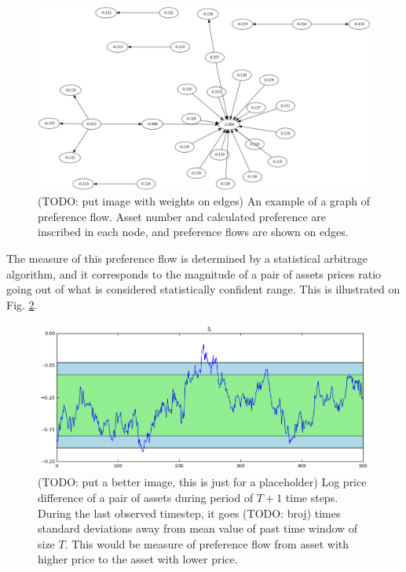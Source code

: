 \documentclass[letterpaper, 10 pt, conference]{ieeeconf}
\begin{document}
  \begin{figure}[h]
    \centering
    \includegraphics[width=\columnwidth]{graphics/graph.pdf}
    \caption{(TODO: put image with weights on edges) An example of a graph of preference flow. Asset number and calculated preference are inscribed in each node, and preference flows are shown on edges.}
    \label{fig:graph}
  \end{figure}
  
  The measure of this preference flow is determined by a statistical arbitrage algorithm, and it corresponds to the magnitude of a pair of assets prices ratio going out of what is considered statistically confident range.
  This is illustrated on Fig. \ref{fig:devmag}.
  
  \begin{figure}[h]
    \centering
    \includegraphics[width=0.9\columnwidth]{graphics/deviation-magnitude.png}
    \caption{(TODO: put a better image, this is just for a placeholder) Log price difference of a pair of assets during period of $T + 1$ time steps.
    During the last observed timestep, it goes (TODO: broj) times standard deviations away from mean value of past time window of size $T$. This would be measure of preference flow from asset with higher price to the asset with lower price.}
    \label{fig:devmag}
  \end{figure}
\end{document}
